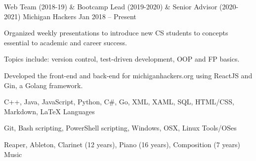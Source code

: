 \documentclass[]{awesome-cv}
\begin{document}
	\vspace{-4mm}
	\cventry
	{Web Team (2018-19) \& Bootcamp Lead (2019-2020) \& Senior Advisor (2020-2021)}
	{Michigan Hackers}
	{}
	{Jan 2018 – Present}
	{\begin{cvitems}
		\item {Organized weekly presentations to introduce new CS students to concepts essential to academic and career success.}
		\item {Topics include: version control, test-driven development, OOP and FP basics.}
		\item {Developed the front-end and back-end for michiganhackers.org using ReactJS and Gin, a Golang framework.}
		\end{cvitems}}
	\vspace{-4mm}



\vspace{-2mm}
	\cventry
	{C++, Java, JavaScript, Python, C\#, Go, XML, XAML, SQL, HTML/CSS, Markdown, LaTeX}
	{Languages}
	{}
	{}
	{}

	\vspace{-8mm}
	\cventry
	{Git, Bash scripting, PowerShell scripting, Windows, OSX, Linux}
	{Tools/OSes}
	{}
	{}
	{}
	
	\vspace{-8mm}
	\cventry
	{Reaper, Ableton, Clarinet (12 years), Piano (16 years), Composition (7 years)}
	{Music}
	{}
	{}
	{}
	\vspace{-4mm}
\end{document}
